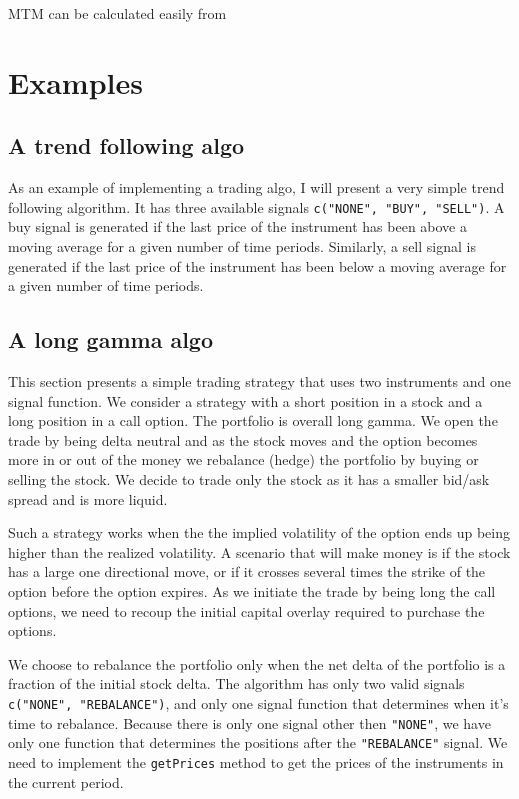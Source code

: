 \documentclass[nofootinbib]{revtex4}
\newcommand{\code}[1]{{\texttt{#1}}}
\begin{document}
MTM can be calculated easily from 


\section{Examples}

\subsection{A trend following algo}
\label{appendixTF}

As an example of implementing a trading algo, I will present a very
simple trend following algorithm.  It has three available signals
\code{c("NONE", "BUY", "SELL")}.  A buy signal is generated if the
last price of the instrument has been above a moving average for a
given number of time periods.  Similarly, a sell signal is generated
if the last price of the instrument has been below a moving average
for a given number of time periods.


\subsection{A long gamma algo}
\label{appendixLG}

This section presents a simple trading strategy that uses two
instruments and one signal function.  We consider a strategy with a
short position in a stock and a long position in a call option.  The
portfolio is overall long gamma.  We open the trade by being delta
neutral and as the stock moves and the option becomes more in or out
of the money we rebalance (hedge) the portfolio by buying or selling
the stock.  We decide to trade only the stock as it has a smaller
bid/ask spread and is more liquid.

Such a strategy works when the the implied volatility of the option
ends up being higher than the realized volatility.  A scenario that
will make money is if the stock has a large one directional move, or
if it crosses several times the strike of the option before the option
expires.  As we initiate the trade by being long the call options, we
need to recoup the initial capital overlay required to purchase the
options.

We choose to rebalance the portfolio only when the net delta of the
portfolio is a fraction of the initial stock delta.  The algorithm has
only two valid signals \code{c("NONE", "REBALANCE")}, and only one
signal function that determines when it's time to rebalance.  Because
there is only one signal other then \code{"NONE"}, we have only one
function that determines the positions after the \code{"REBALANCE"}
signal.  We need to implement the \code{getPrices} method to get the
prices of the instruments in the current period.  
\end{document}

